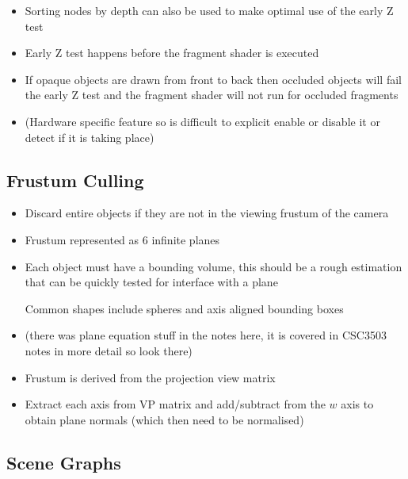 \documentclass[a4paper]{article}
\begin{document}
\begin{itemize}
  \item
    Sorting nodes by depth can also be used to make optimal use of the early Z
    test

  \item
    Early Z test happens before the fragment shader is executed

  \item
    If opaque objects are drawn from front to back then occluded objects will
    fail the early Z test and the fragment shader will not run for occluded
    fragments

  \item
    (Hardware specific feature so is difficult to explicit enable or disable it
    or detect if it is taking place)

\end{itemize}

\subsection{Frustum Culling}

\begin{itemize}
  \item
    Discard entire objects if they are not in the viewing frustum of the camera

  \item
    Frustum represented as 6 infinite planes

  \item
    Each object must have a bounding volume, this should be a rough estimation
    that can be quickly tested for interface with a plane

    Common shapes include spheres and axis aligned bounding boxes

  \item
    (there was plane equation stuff in the notes here, it is covered in CSC3503
    notes in more detail so look there)

  \item
    Frustum is derived from the projection view matrix

  \item
    Extract each axis from VP matrix and add/subtract from the $w$ axis to
    obtain plane normals (which then need to be normalised)

\end{itemize}

\subsection{Scene Graphs}
\end{document}
